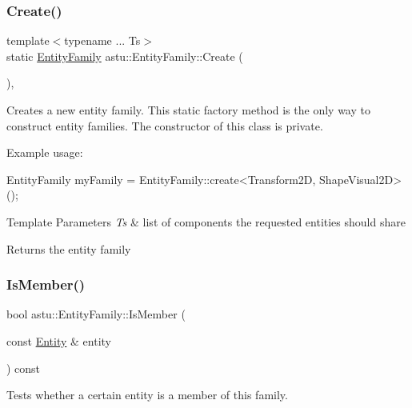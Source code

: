 \subsubsection{\texorpdfstring{Create()}{Create()}}
{\footnotesize\ttfamily template$<$typename ... Ts$>$ \\
static \hyperlink{classastu_1_1EntityFamily}{Entity\+Family} astu\+::\+Entity\+Family\+::\+Create (\begin{DoxyParamCaption}{ }\end{DoxyParamCaption})\hspace{0.3cm}{\ttfamily [inline]}, {\ttfamily [static]}}

Creates a new entity family. This static factory method is the only way to construct entity families. The constructor of this class is private.

Example usage\+: 
\begin{DoxyCode}
EntityFamily myFamily 
 = EntityFamily::create<Transform2D, ShapeVisual2D>();
\end{DoxyCode}



\begin{DoxyTemplParams}{Template Parameters}
{\em Ts} & list of components the requested entities should share \\
\hline
\end{DoxyTemplParams}
\begin{DoxyReturn}{Returns}
the entity family 
\end{DoxyReturn}
\mbox{\label{classastu_1_1EntityFamily_a8452fd5df3f194dd8824b9ea88d426bf}} 
\subsubsection{\texorpdfstring{Is\+Member()}{IsMember()}}
{\footnotesize\ttfamily bool astu\+::\+Entity\+Family\+::\+Is\+Member (\begin{DoxyParamCaption}\item[{const \hyperlink{classastu_1_1Entity}{Entity} \&}]{entity }\end{DoxyParamCaption}) const\hspace{0.3cm}{\ttfamily [inline]}}

Tests whether a certain entity is a member of this family.


